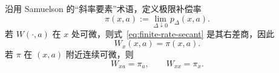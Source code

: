 沿用 Samuelson 的“斜率要素”术语，定义极限补偿率
\begin{equation}
\boxed{
\pi(x,a):=\lim_{\Delta\downarrow0}p_\Delta(x,a).}
\label{eq:pi-def}
\end{equation}
若 $W(\cdot,a)$ 在 $x$ 处可微，则式~\eqref{eq:finite-rate-secant} 是其右差商，因此
\begin{equation}
\boxed{W_x(x,a)=\pi(x,a).}
\label{eq:Wx-pi}
\end{equation}
若 $\pi$ 在 $(x,a)$ 附近连续可微，则
\begin{equation}
W_{xa}=\pi_a,
\qquad
W_{xx}=\pi_x.
\label{eq:pi-derivatives}
\end{equation}
